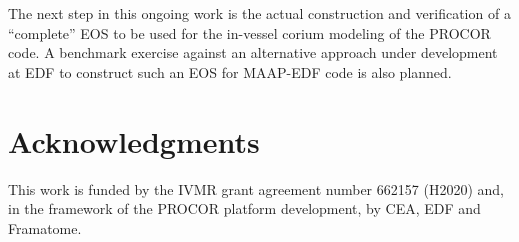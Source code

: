 \documentclass[11pt]{article}\usepackage{geometry} \geometry{letterpaper, margin=25.4mm}
\begin{document}
The next step in this ongoing work is the actual construction and verification of a ``complete'' EOS to be used for the in-vessel corium modeling of the PROCOR code. A benchmark exercise against an alternative approach under development at EDF to construct such an EOS for MAAP-EDF code is also planned.

\section*{Acknowledgments}

This work is funded by the IVMR grant agreement number 662157 (H2020) and, in the framework of the PROCOR platform development, by CEA, EDF and Framatome.


\end{document}
